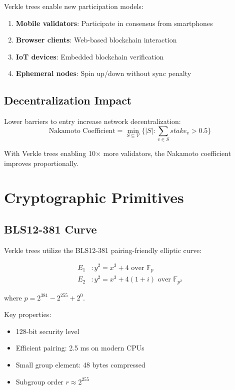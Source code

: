 \documentclass[11pt,a4paper]{article}
\theoremstyle{definition}
\begin{document}
Verkle trees enable new participation models:
\begin{enumerate}
    \item \textbf{Mobile validators}: Participate in consensus from smartphones
    \item \textbf{Browser clients}: Web-based blockchain interaction
    \item \textbf{IoT devices}: Embedded blockchain verification
    \item \textbf{Ephemeral nodes}: Spin up/down without sync penalty
\end{enumerate}

\subsection{Decentralization Impact}

Lower barriers to entry increase network decentralization:
\begin{equation}
    \text{Nakamoto Coefficient} = \min_{S \subseteq \mathcal{V}} \{|S| : \sum_{v \in S} stake_v > 0.5\}
\end{equation}

With Verkle trees enabling 10× more validators, the Nakamoto coefficient improves proportionally.

\section{Cryptographic Primitives}

\subsection{BLS12-381 Curve}

Verkle trees utilize the BLS12-381 pairing-friendly elliptic curve:

\begin{align}
    E_1 &: y^2 = x^3 + 4 \text{ over } \mathbb{F}_p \\
    E_2 &: y^2 = x^3 + 4(1+i) \text{ over } \mathbb{F}_{p^2}
\end{align}

where $p = 2^{381} - 2^{255} + 2^0$.

Key properties:
\begin{itemize}
    \item 128-bit security level
    \item Efficient pairing: 2.5 ms on modern CPUs
    \item Small group element: 48 bytes compressed
    \item Subgroup order $r \approx 2^{255}$
\end{itemize}
\end{document}
